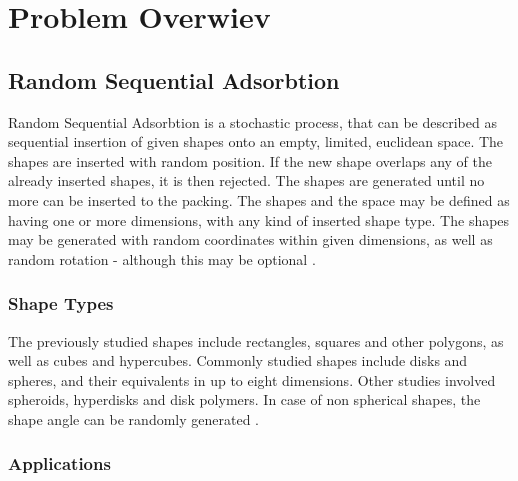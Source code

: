 \documentclass[12pt, oneside]{report}
\begin{document}

\tableofcontents
\newpage


\chapter{Problem Overwiev}
\section {Random Sequential Adsorbtion}

Random Sequential Adsorbtion is a stochastic process, that can be described as sequential insertion of given shapes onto an empty, limited, euclidean space. The shapes are inserted with random position. If the new shape overlaps any of the already inserted shapes, it is then rejected. The shapes are generated until no more can be inserted to the packing. \newline
The shapes and the space may be defined as having one or more dimensions, with any kind of inserted shape type. The shapes may be generated with random coordinates within given dimensions, as well as random rotation - although this may be optional \cite{zhang,feder}.

\subsection {Shape Types}

The previously studied shapes include rectangles, squares and other polygons, as well as cubes and hypercubes. Commonly studied shapes include disks and spheres, and their equivalents in up to eight dimensions. Other studies involved spheroids, hyperdisks and disk polymers. In case of non spherical shapes, the shape angle can be randomly generated \cite{zhang}.

\subsection {Applications}
\end{document}
